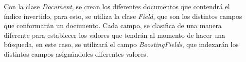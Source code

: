 \documentclass{memoria}
\begin{document}

Con la clase \textsl{Document}, se crean los diferentes documentos que contendrá el índice invertido, para esto, se utiliza la clase \textsl{Field}, que son los distintos campos que conformarán un documento. Cada campo, se clasifica de una manera diferente para establecer los valores que tendrán al momento de hacer una búsqueda, en este caso, se utilizará el campo \textsl{BoostingFields}, que indexarán los distintos campos asignándoles diferentes valores.
    
\newpage
{}
\end{document}
